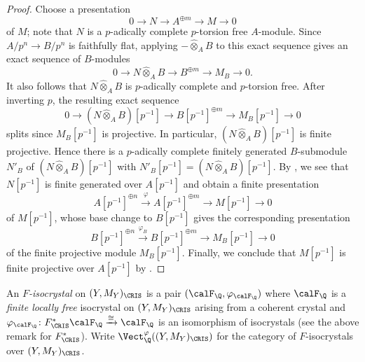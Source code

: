 \begin{proof}
Choose a presentation
\[
0 \to N \to A^{\oplus m} \to M \to 0
\]
of $M$; note that $N$ is a $p$-adically complete $p$-torsion free $A$-module. Since $A/p^n\rightarrow B/p^n$ is faithfully flat, applying $-\widehat{\otimes}_A B$ to this exact sequence gives an exact sequence of $B$-modules
\[
0 \to N\widehat{\otimes}_A B \to B^{\oplus m} \to M_B \to 0.
\]
It also follows that $N\widehat{\otimes}_A B$ is $p$-adically complete and $p$-torsion free. After inverting $p$, the resulting exact sequence  
\[
0 \to (N\widehat{\otimes}_A B)[p^{-1}] \to B[p^{-1}]^{\oplus m} \to M_B[p^{-1}] \to 0
\]
splits since $M_B[p^{-1}]$ is projective. In particular, $(N\widehat{\otimes}_A B)[p^{-1}]$ is finite projective. Hence there is a $p$-adically complete finitely generated $B$-submodule $N'_B$ of $(N\widehat{\otimes}_A B)[p^{-1}]$ with $N'_B[p^{-1}] = (N\widehat{\otimes}_A B)[p^{-1}]$. By \cite[Prop.~2.7]{drinfeld-stackycrystal}, we see that $N[p^{-1}]$ is finite generated over $A[p^{-1}]$ and obtain a finite presentation
\[
A[p^{-1}]^{\oplus n}\xrightarrow{\varphi} A[p^{-1}]^{\oplus m} \to M[p^{-1}] \to 0
\]
of $M[p^{-1}]$, whose base change to $B[p^{-1}]$ gives the corresponding presentation
\[
B[p^{-1}]^{\oplus n}\xrightarrow{\varphi_B} B[p^{-1}]^{\oplus m} \to M_B[p^{-1}] \to 0
\]
of the finite projective module $M_B[p^{-1}]$. Finally, we conclude that $M[p^{-1}]$ is finite projective over $A[p^{-1}]$ by \cite[Cor.~2.6]{drinfeld-stackycrystal}.
\end{proof} 


\begin{defn}\label{def:F-isocrystals}
An \emph{$F$-isocrystal} on $(Y,M_Y)_\CRIS$ is a pair $(\calF_\Q, \varphi_{\calF_\Q})$ where $\calF_\Q$ is a \emph{finite locally free} isocrystal on $(Y,M_Y)_\CRIS$ arising from a coherent crystal and $\varphi_{\calF_\Q}\colon F_{\CRIS}^\ast \calF_{\Q}\xrightarrow{\cong}\calF_{\Q}$ is an isomorphism of isocrystals (see the above remark for $F_\CRIS^\ast$).  
Write $\Vect_\Q^\varphi((Y,M_{Y})_\CRIS)$ for the category of $F$-isocrystals over $(Y,M_Y)_\CRIS$.
\end{defn}


